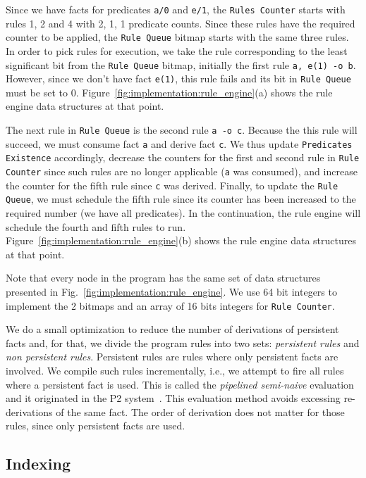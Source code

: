 Since we have facts for predicates \texttt{a/0} and \texttt{e/1}, the
\texttt{Rules Counter} starts with rules 1, 2 and 4 with 2, 1, 1 predicate
counts. Since these rules have the required counter to be applied, the
\texttt{Rule Queue} bitmap starts with the same three rules.  In order to pick
rules for execution, we take the rule corresponding to the least significant bit
from the \texttt{Rule Queue} bitmap, initially the first rule \texttt{a, e(1) -o
   b}. However, since we don't have fact \texttt{e(1)}, this rule fails and its
bit in \texttt{Rule Queue} must be set to 0.
Figure~\ref{fig:implementation:rule_engine}(a) shows the rule engine data
structures at that point.

The next rule in \texttt{Rule Queue} is the second rule \texttt{a -o c}.
Because the this rule will succeed, we must consume fact \texttt{a} and derive
fact \texttt{c}. We thus update \texttt{Predicates Existence} accordingly,
decrease the counters for the first and second rule in \texttt{Rule Counter}
since such rules are no longer applicable (\texttt{a} was consumed), and
increase the counter for the fifth rule since \texttt{c} was derived. Finally,
to update the \texttt{Rule Queue}, we must schedule the fifth rule since its
counter has been increased to the required number (we have all predicates).  In
the continuation, the rule engine will schedule the fourth and fifth rules to
run. Figure~\ref{fig:implementation:rule_engine}(b) shows the rule engine data
structures at that point.

Note that every node in the program has the same set of data structures
presented in Fig.~\ref{fig:implementation:rule_engine}. We use 64 bit integers
to implement the 2 bitmaps and an array of 16 bits integers for \texttt{Rule
   Counter}.

We do a small optimization to reduce the number of derivations of persistent
facts and, for that, we divide the program rules into two sets: \emph{persistent
   rules} and \emph{non persistent rules}.  Persistent rules are rules where
only persistent facts are involved. We compile such rules incrementally, i.e.,
we attempt to fire all rules where a persistent fact is used. This is called the
\emph{pipelined semi-naive} evaluation and it originated in the P2
system~\cite{Loo-condie-garofalakis-p2}. This evaluation method avoids excessing
re-derivations of the same fact. The order of derivation does not matter for
those rules, since only persistent facts are used.

\subsection{Indexing}\label{sec:implementation:indexing}

